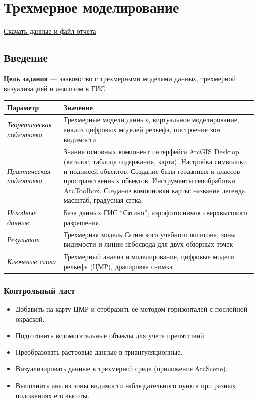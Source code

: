 \documentclass[]{book}
\providecommand{\tightlist}{%
  \setlength{\itemsep}{0pt}\setlength{\parskip}{0pt}}
\theoremstyle{definition}
\theoremstyle{definition}
\theoremstyle{definition}
\theoremstyle{remark}
\begin{document}
\hypertarget{threed-modelling}{%
\chapter{Трехмерное моделирование}\label{threed-modelling}}

\href{http://autolab.geogr.msu.ru/gis/data/Ex18.zip}{Скачать данные и
файл отчета}

\hypertarget{threed-modelling-intro}{%
\section{Введение}\label{threed-modelling-intro}}

\textbf{Цель задания} --- знакомство с трехмерными моделями данных,
трехмерной визуализацией и анализом в ГИС

\begin{longtable}[]{@{}ll@{}}
\toprule
Параметр & Значение\tabularnewline
\midrule
\endhead
\emph{Теоретическая подготовка} & Трехмерные модели данных, виртуальное
моделирование, анализ цифровых моделей рельефа, построение зон
видимости.\tabularnewline
\emph{Практическая подготовка} & Знание основных компонент интерфейса
ArcGIS Desktop (каталог, таблица содержания, карта). Настройка символики
и подписей объектов. Создание базы геоданных и классов пространственных
объектов. Инструменты геообработки ArcToolbox. Создание компоновки
карты: название легенда, масштаб, градусная сетка.\tabularnewline
\emph{Исходные данные} & База данных ГИС ``Сатино'', аэрофотоснимок
сверхвысокого разрешения.\tabularnewline
\emph{Результат} & Трехмерная модель Сатинского учебного полигона, зоны
видимости и линии небосвода для двух обзорных точек\tabularnewline
\emph{Ключевые слова} & Трехмерный анализ и моделирование, цифровые
модели рельефа (ЦМР), драпировка снимка\tabularnewline
\bottomrule
\end{longtable}

\hypertarget{threed-modelling-control}{%
\subsection{Контрольный лист}\label{threed-modelling-control}}

\begin{itemize}
\tightlist
\item
  Добавить на карту ЦМР и отобразить ее методом горизонталей с послойной
  окраской.
\item
  Подготовить вспомогательные объекты для учета препятствий.
\item
  Преобразовать растровые данные в триангуляционные.
\item
  Визуализировать данные в трехмерной среде (приложение ArcScene).
\item
  Выполнить анализ зоны видимости наблюдательного пункта при разных
  положениях его высоты.
\end{itemize}
\end{document}
